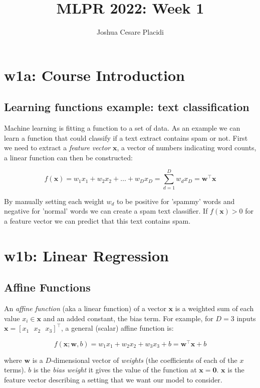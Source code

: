 \documentclass{article}
\title{MLPR 2022: Week 1}
\author{Joshua Cesare Placidi}
\begin{document}
\maketitle

\section{w1a: Course Introduction}

\subsection{Learning functions example: text classification}

Machine learning is fitting a function to a set of data.
As an example we can learn a function that could classify if a text extract contains spam or not.
First we need to extract a \emph{feature vector} $\mathbf{x}$, a vector of numbers indicating word counts, a linear function can then be constructed:

\[
f(\mathbf{x}) = w_1 x_1 + w_2 x_2 + \dots + w_D x_D = \sum^{D}_{d=1}w_dx_D = \mathbf{w}^\top\mathbf{x}
\]

By manually setting each weight $w_d$ to be positive for 'spammy' words and negative for 'normal' words we can create a spam text classifier.
If $f(\mathbf{x}) > 0$ for a feature vector we can predict that this text contains spam.


\section{w1b: Linear Regression}

\subsection{Affine Functions}

An \emph{affine function} (aka a linear function) of a vector $\mathbf{x}$ is a weighted sum of each value $x_i \in \mathbf{x}$ and an added constant, the bias term.
For example, for $D=3$ inputs $\mathbf{x} = [x_1 \text{ } x_2 \text{ } x_3]^\top$, a general (scalar) affine function is:

\[
	f(\mathbf{x}; \mathbf{w}, b) = w_1 x_1 + w_2 x_2 + w_3 x_3 + b = \mathbf{w}^\top \mathbf{x} + b
\]

where $\mathbf{w}$ is a $D$-dimensional vector of \emph{weights} (the coefficients of each of the $x$ terms).
$b$ is the \emph{bias weight} it gives the value of the function at $\mathbf{x}=\mathbf{0}$.
$\mathbf{x}$ is the feature vector describing a setting that we want our model to consider.
\end{document}
